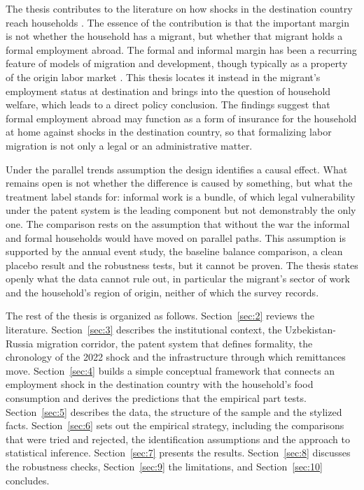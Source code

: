 The thesis contributes to the literature on how shocks in the destination country reach households \parencite{yang2008,shimizutani2021}. The essence of the contribution is that the important margin is not whether the household has a migrant, but whether that migrant holds a formal employment abroad. The formal and informal margin has been a recurring feature of models of migration and development, though typically as a property of the origin labor market \parencite{docquier2019}. This thesis locates it instead in the migrant's employment status at destination and brings into the question of household welfare, which leads to a direct policy conclusion. The findings suggest that formal employment abroad may function as a form of insurance for the household at home against shocks in the destination country, so that formalizing labor migration is not only a legal or an administrative matter. 

Under the parallel trends assumption the design identifies a causal effect. What remains open is not whether the difference is caused by something, but what the treatment label stands for: informal work is a bundle, of which legal vulnerability under the patent system is the leading component but not demonstrably the only one. The comparison rests on the assumption that without the war the informal and formal households would have moved on parallel paths. This assumption is supported by the annual event study, the baseline balance comparison, a clean placebo result and the robustness tests, but it cannot be proven. The thesis states openly what the data cannot rule out, in particular the migrant's sector of work and the household's region of origin, neither of which the survey records.

The rest of the thesis is organized as follows. Section~\ref{sec:2} reviews the literature. Section~\ref{sec:3} describes the institutional context, the Uzbekistan-Russia migration corridor, the patent system that defines formality, the chronology of the 2022 shock and the infrastructure through which remittances move. Section~\ref{sec:4} builds a simple conceptual framework that connects an employment shock in the destination country with the household's food consumption and derives the predictions that the empirical part tests. Section~\ref{sec:5} describes the data, the structure of the sample and the stylized facts. Section~\ref{sec:6} sets out the empirical strategy, including the comparisons that were tried and rejected, the identification assumptions and the approach to statistical inference. Section~\ref{sec:7} presents the results. Section~\ref{sec:8} discusses the robustness checks, Section~\ref{sec:9} the limitations, and Section~\ref{sec:10} concludes.


